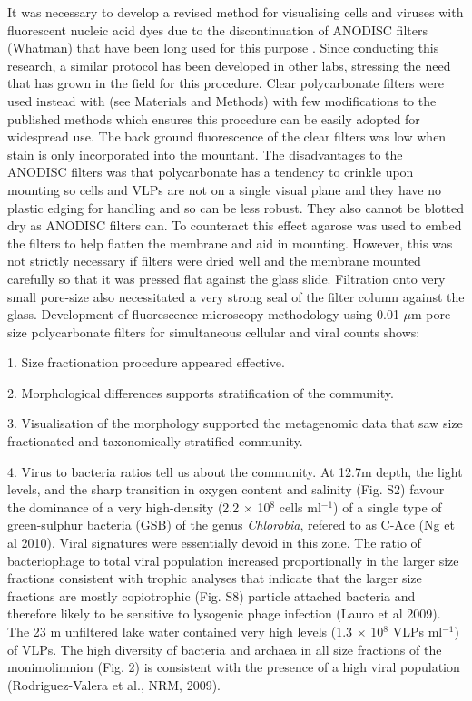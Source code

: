 It was necessary to develop a revised method for visualising cells and viruses with fluorescent nucleic acid dyes due to the discontinuation of ANODISC filters (Whatman) that have been long used for this purpose \cite{Hennes1995, Noble1998}. %
Since conducting this research, a similar protocol has been developed in other labs, stressing the need that has grown in the field for this procedure. %
Clear polycarbonate filters were used instead with (see Materials and Methods) with few modifications to the published methods which ensures this procedure can be easily adopted for widespread use.
The back ground fluorescence of the clear filters was low when stain is only incorporated into the mountant.
The disadvantages to the ANODISC filters was that polycarbonate has a tendency to crinkle upon mounting so cells and VLPs are not on a single visual plane and they have no plastic edging for handling and so can be less robust.
They also cannot be blotted dry as ANODISC filters can.
To counteract this effect agarose was used to embed the filters to help flatten the membrane and aid in mounting.
However, this was not strictly necessary if filters were dried well and the membrane mounted carefully so that it was pressed flat against the glass slide.
Filtration onto very small pore-size also necessitated a very strong seal of the filter column against the glass.
Development of fluorescence microscopy methodology using 0.01 $\mu$m pore-size polycarbonate filters for simultaneous cellular and viral counts shows:

1. Size fractionation procedure appeared effective.

2. Morphological differences supports stratification of the community.

3. Visualisation of the morphology supported the metagenomic data that saw size fractionated and taxonomically stratified community.

4. Virus to bacteria ratios tell us about the community.
At 12.7m depth, the light levels, and the sharp transition in oxygen content and salinity (Fig. S2) favour the dominance of a very high-density (2.2 $\times$ 10$^8$ cells ml$^{-1}$) of a single type of green-sulphur bacteria (GSB) of the genus \textit{Chlorobia}, refered to as C-Ace (Ng et al 2010). 
Viral signatures were essentially devoid in this zone. 
The ratio of bacteriophage to total viral population increased proportionally in the larger size fractions consistent with trophic analyses that indicate that the larger size fractions are mostly copiotrophic (Fig. S8) particle attached bacteria and therefore likely to be sensitive to lysogenic phage infection (Lauro et al 2009). 
The 23 m unfiltered lake water contained very high levels (1.3 $\times$ 10$^8$ VLPs ml$^{-1}$) of VLPs. 
The high diversity of bacteria and archaea in all size fractions of the monimolimnion (Fig. 2) is consistent with the presence of a high viral population (Rodriguez-Valera et al., NRM, 2009).

